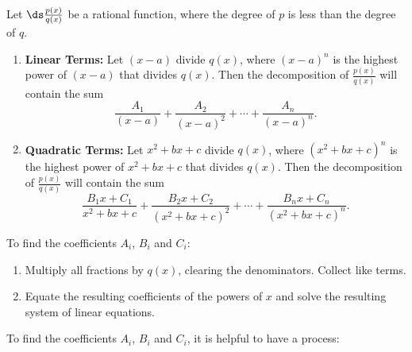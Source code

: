 \begin{formulabox} \label{idea:partial_fraction}
{Let $\ds \frac{p(x)}{q(x)}$ be a rational function, where the degree of $p$ is less than the degree of $q$.
\begin{enumerate}
	\item	\textbf{Linear Terms:} Let $(x-a)$ divide $q(x)$, where $(x-a)^n$ is the highest power of $(x-a)$ that divides $q(x)$. Then the decomposition of $\frac{p(x)}{q(x)}$ will contain the sum
	$$\frac{A_1}{(x-a)} + \frac{A_2}{(x-a)^2} + \cdots +\frac{A_n}{(x-a)^n}.$$
	\item		\textbf{Quadratic Terms:} Let $x^2+bx+c$ divide $q(x)$, where $(x^2+bx+c)^n$ is the highest power of $x^2+bx+c$ that divides $q(x)$. Then the decomposition of $\frac{p(x)}{q(x)}$ will contain the sum 
	$$\frac{B_1x+C_1}{x^2+bx+c}+\frac{B_2x+C_2}{(x^2+bx+c)^2}+\cdots+\frac{B_nx+C_n}{(x^2+bx+c)^n}.$$
	\end{enumerate}
	To find the coefficients $A_i$, $B_i$ and $C_i$:
	\begin{enumerate}
	\item	Multiply all fractions by $q(x)$, clearing the denominators. Collect like terms.
	\item		Equate the resulting coefficients of the powers of $x$ and solve the resulting system of linear equations.
	\end{enumerate}
}
\end{formulabox}

To find the coefficients $A_i$, $B_i$ and $C_i$, it is helpful to have a process:

